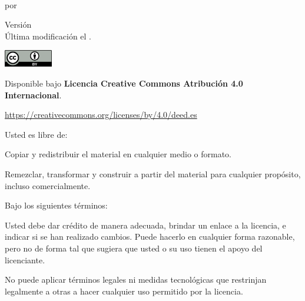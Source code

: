 \vspace*{\fill}

\noindent \textit{\Title{}} \\
por \Soler{}


\vspace{4em}

\noindent Versión \ThesisVersion{} \\
Última modificación el .

\vspace{5em}

\noindent \includegraphics[height=2em]{figs/logos/cc-by.png}

\noindent Disponible bajo
{\bf Licencia Creative Commons Atribución 4.0 Internacional}.

\noindent
\url{https://creativecommons.org/licenses/by/4.0/deed.es}

\vspace{1em}

\noindent
Usted es libre de:

\begin{description}[labelindent=0.5cm]
    \item[Compartir:]{
        Copiar y redistribuir el material en cualquier medio o formato.
    }
    \item[Adaptar:]{
        Remezclar, transformar y construir a partir del material
        para cualquier propósito, incluso comercialmente.
    }
\end{description}

\noindent Bajo los siguientes términos:

\begin{description}[labelindent=0.5cm]
    \item[Atribución:]{
        Usted debe dar crédito de manera adecuada, brindar un enlace a la
        licencia, e indicar si se han realizado cambios. Puede hacerlo en cualquier
        forma razonable, pero no de forma tal que sugiera que usted o su uso tienen el
        apoyo del licenciante.
    }
    \item[No hay restricciones adicionales:]{
        No puede aplicar términos legales ni medidas tecnológicas que
        restrinjan legalmente a otras a hacer cualquier uso permitido por la
        licencia.
    }
\end{description}
